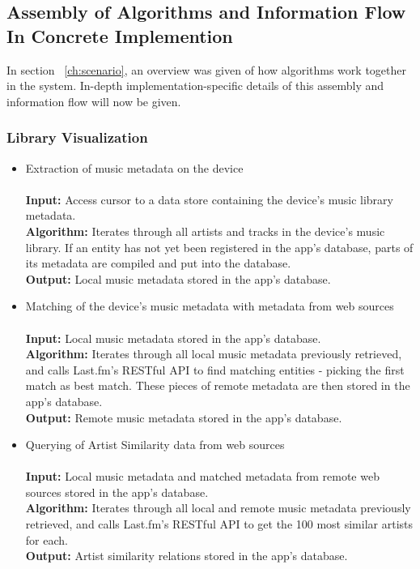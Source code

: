 \subsection{Assembly of Algorithms and Information Flow In Concrete Implemention}

In section ~\ref{ch:scenario}, an overview was given of how algorithms work together in the system. In-depth implementation-specific details of this assembly and information flow will now be given.

\subsubsection{Library Visualization}

\begin{itemize}
	\item Extraction of music metadata on the device \\\\
			\textbf{Input:} Access cursor to a data store containing the device's music library metadata.  \\
			\textbf{Algorithm:} Iterates through all artists and tracks in the device's music library.
			If an entity has not yet been registered in the app's database, parts of its metadata are 
			compiled and put into the database. \\
			\textbf{Output:} Local music metadata stored in the app's database.\\
			
	\item Matching of the device's music metadata with metadata from web sources \\\\
			\textbf{Input:} Local music metadata stored in the app's database.  \\
			\textbf{Algorithm:} Iterates through all local music metadata previously retrieved, and calls
			Last.fm's RESTful API to find matching entities - picking the first match as best match. These pieces
			of remote metadata are then stored in the app's database. \\
			\textbf{Output:} Remote music metadata stored in the app's database. \\
			
	\item Querying of Artist Similarity data from web sources \\\\
			\textbf{Input:} Local music metadata and matched metadata from remote web sources stored in the app's database. \\
			\textbf{Algorithm:} Iterates through all local and remote music metadata previously retrieved, and calls
			Last.fm's RESTful API to get the 100 most similar artists for each. \\
			\textbf{Output:} Artist similarity relations stored in the app's database. \\
			

\end{itemize}
